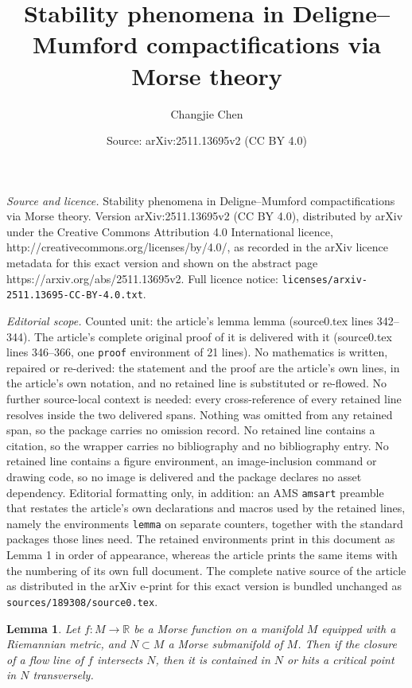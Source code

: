 \documentclass[10pt,a4paper]{amsart}
\title{Stability phenomena in Deligne--Mumford compactifications via Morse theory}
\author{Changjie Chen}
\date{Source: arXiv:2511.13695v2 (CC BY 4.0)}
\newtheorem{lemma}{Lemma}
\begin{document}
\maketitle

\noindent\emph{Source and licence.} Stability phenomena in Deligne--Mumford compactifications via Morse theory. Version arXiv:2511.13695v2 (CC BY 4.0), distributed by arXiv under the Creative Commons Attribution 4.0 International licence, http://creativecommons.org/licenses/by/4.0/, as recorded in the arXiv licence metadata for this exact version and shown on the abstract page https://arxiv.org/abs/2511.13695v2. Full licence notice: \texttt{licenses/arxiv-2511.13695-CC-BY-4.0.txt}.\par\smallskip

\noindent\textit{Editorial scope.} Counted unit: the article's lemma lemma (source0.tex lines 342--344). The article's complete original proof of it is delivered with it (source0.tex lines 346--366, one \texttt{proof} environment of 21 lines). No mathematics is written, repaired or re-derived: the statement and the proof are the article's own lines, in the article's own notation, and no retained line is substituted or re-flowed.  No further source-local context is needed: every cross-reference of every retained line resolves inside the two delivered spans.  Nothing was omitted from any retained span, so the package carries no omission record.  No retained line contains a citation, so the wrapper carries no bibliography and no bibliography entry.  No retained line contains a figure environment, an image-inclusion command or drawing code, so no image is delivered and the package declares no asset dependency.  Editorial formatting only, in addition: an AMS \texttt{amsart} preamble that restates the article's own declarations and macros used by the retained lines, namely the environments \texttt{lemma} on separate counters, together with the standard packages those lines need.  The retained environments print in this document as Lemma 1 in order of appearance, whereas the article prints the same items with the numbering of its own full document.  The complete native source of the article as distributed in the arXiv e-print for this exact version is bundled unchanged as \texttt{sources/189308/source0.tex}.
\begin{lemma}
    Let $f\colon M\to\mathbb R$ be a Morse function on a manifold $M$ equipped with a Riemannian metric, and $N\subset M$ a Morse submanifold of $M$. Then if the closure of a flow line of $f$ intersects $N$, then it is contained in $N$ or hits a critical point in $N$ transversely.
\end{lemma}
\end{document}
